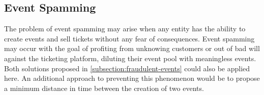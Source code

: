 \subsection{Event Spamming}\label{subsection:event-spamming}
The problem of event spamming may arise when any entity has the ability to create events and sell tickets without any fear of consequences. Event spamming may occur with the goal of profiting from unknowing customers or out of bad will against the ticketing platform, diluting their event pool with meaningless events.
Both solutions proposed in \ref{subsection:fraudulent-events} could also be applied here. An additional approach to preventing this phenomenon would be to propose a minimum distance in time between the creation of two events.
